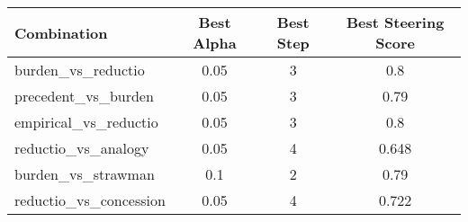 \begin{tabular}{lccc}
\toprule
Combination & Best Alpha & Best Step & Best Steering Score \\
\midrule
burden_vs_reductio & 0.05 & 3 & 0.8 \\
precedent_vs_burden & 0.05 & 3 & 0.79 \\
empirical_vs_reductio & 0.05 & 3 & 0.8 \\
reductio_vs_analogy & 0.05 & 4 & 0.648 \\
burden_vs_strawman & 0.1 & 2 & 0.79 \\
reductio_vs_concession & 0.05 & 4 & 0.722 \\
\bottomrule
\end{tabular}